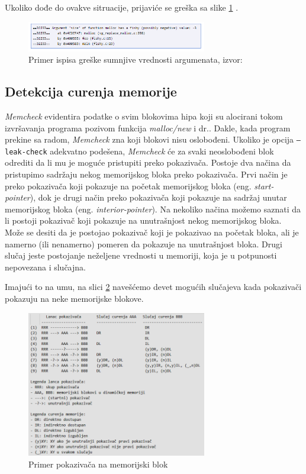 \documentclass[12pt,oneside]{memoir}
\theoremstyle{plain}
\theoremstyle{definition}
\begin{document}
Ukoliko dođe do ovakve sitruacije, prijaviće se greška sa slike \ref{fig:slika2.11} \cite{Memcheck}. 
\begin{figure}[!ht]
  \centering
  \includegraphics[width=0.7\textwidth]{fishyArgument.png}
  \caption{Primer ispisa greške sumnjive vrednosti argumenata, izvor: \cite{Memcheck}}
  \label{fig:slika2.11}
\end{figure}

\subsection{Detekcija curenja memorije}
\textit{Memcheck} evidentira podatke o svim blokovima hipa koji su alocirani tokom izvršavanja programa pozivom funkcija \textit{malloc/new} i dr.. Dakle, kada program prekine sa radom, \textit{Memcheck} zna koji blokovi nisu oslobođeni. Ukoliko je opcija \texttt{--leak-check}  adekvatno podešena, \textit{Memcheck} će za svaki neoslobođeni blok odrediti da li mu je moguće pristupiti preko pokazivača. 
Postoje dva načina da pristupimo sadržaju nekog memorijskog bloka preko pokazivača. Prvi način je preko pokazivača koji pokazuje na početak memorijskog bloka (eng. \textit{start-pointer}), dok je drugi način preko pokazivača koji pokazuje na sadržaj unutar memorijskog bloka (eng. \textit{interior-pointer}). Na nekoliko načina možemo saznati da li postoji pokazivač koji pokazuje na unutrašnjost nekog memorijskog bloka. Može se desiti da je postojao pokazivač koji je pokazivao na početak bloka, ali je namerno (ili nenamerno) pomeren da pokazuje na unutrašnjost bloka. Drugi slučaj jeste postojanje neželjene vrednosti u memoriji, koja je u potpunosti nepovezana i slučajna.

Imajući to na umu, na slici \ref{fig:slika2.12} navešćemo devet mogućih slučajeva kada pokazivači pokazuju na neke memorijske blokove.
\begin{figure}[!ht]
  \centering
  \includegraphics[width=0.7\textwidth]{memoryLeacking.png}
  \caption{Primer pokazivača na memorijski blok}
  \label{fig:slika2.12}
\end{figure}
\end{document}
